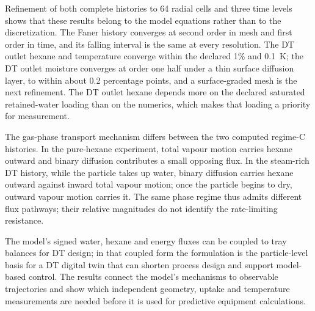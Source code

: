 Refinement of both complete histories to 64 radial cells and three time
levels shows that these results belong to the model equations rather than
to the discretization. The Faner history converges at second order in
mesh and first order in time, and its falling interval is the same at
every resolution. The DT outlet hexane and temperature converge within
the declared 1\% and 0.1~K; the DT outlet moisture converges at order one
half under a thin surface diffusion layer, to within about 0.2 percentage
points, and a surface-graded mesh is the next refinement. The DT outlet
hexane depends more on the declared saturated retained-water loading than
on the numerics, which makes that loading a priority for measurement.

\begin{samepage}
The gas-phase transport mechanism differs between the two computed
regime-C histories. In the pure-hexane experiment, total vapour motion
carries hexane outward and binary diffusion contributes a small opposing
flux. In the steam-rich DT history, while the particle takes up water,
binary diffusion carries hexane outward against inward total vapour
motion; once the particle begins to dry, outward vapour motion carries it.
The same phase regime thus admits different flux pathways; their relative
magnitudes do not identify the rate-limiting resistance.
\par
\end{samepage}

The model's signed water, hexane and energy fluxes can be coupled to tray
balances for DT design; in that coupled form the formulation is the
particle-level basis for a DT digital twin that can shorten process
design and support model-based control. The results connect the model's
mechanisms to observable trajectories and show which independent
geometry, uptake and temperature measurements are needed before it is
used for predictive equipment calculations.
